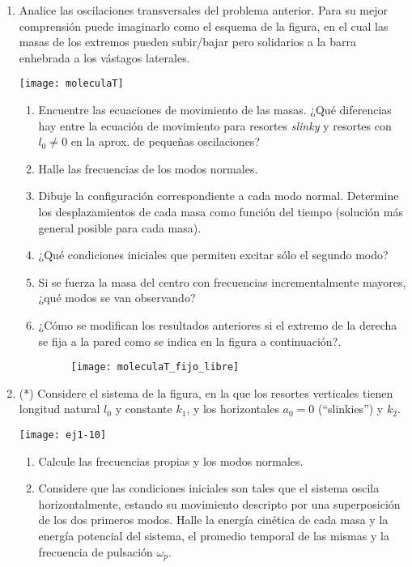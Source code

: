 \documentclass[11pt,spanish,a4paper]{article}
\begin{document}
\begin{enumerate}
\item
\begin{minipage}[t][2.2cm]{0.5\textwidth}
Analice las oscilaciones transversales del problema anterior.
Para su mejor comprensión puede imaginarlo como el esquema de la figura, en el cual las masas de los extremos pueden subir/bajar pero solidarios a la barra enhebrada a los vástagos laterales. 
\end{minipage}
\begin{minipage}[c][0cm][t]{0.45\textwidth}
  \texttt{[image: moleculaT]}
\end{minipage}
\begin{enumerate}
	\item Encuentre las ecuaciones de movimiento de las masas. ¿Qué diferencias hay entre la ecuación de movimiento para resortes \emph{slinky} y resortes con $l_0\ne 0$ en la aprox. de pequeñas oscilaciones?
	\item Halle las frecuencias de los modos normales.
	\item Dibuje la configuración correspondiente a cada modo normal.
Determine los desplazamientos de cada masa como función del tiempo (solución más general posible para cada masa).
	\item ¿Qué condiciones iniciales que permiten excitar sólo el segundo modo?
	\item Si se fuerza la masa del centro con frecuencias incrementalmente mayores, ¿qué modos se van observando?
	\item ¿Cómo se modifican los resultados anteriores si el extremo de la derecha se fija a la pared como se indica en la figura a continuación?.
	\begin{figure}[h]
		\centering
		\texttt{[image: moleculaT\_fijo\_libre]}
	\end{figure} 
\end{enumerate}



\item
\begin{minipage}[t][1.2cm]{0.6\textwidth}
(*) Considere el sistema de la figura, en la que los resortes verticales tienen longitud natural $l_0$ y constante $k_1$, y los horizontales $a_0= 0$ (``slinkies'') y $k_2$.
\end{minipage}
\begin{minipage}[c][2cm][t]{0.35\textwidth}
  \texttt{[image: ej1-10]}
\end{minipage}
\begin{enumerate}
  \item Calcule las frecuencias propias y los modos normales. 
  \item Considere que las condiciones iniciales son tales que el sistema oscila horizontalmente, estando su movimiento descripto por una superposición de los dos primeros modos.
  Halle la energía cinética de cada masa y la energía potencial del sistema, el promedio temporal de las mismas y la frecuencia de pulsación $\omega_{p}$.
\end{enumerate}



\end{enumerate}
\end{document}
